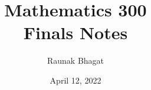 \documentclass{article}
\newcommand{\myname}{Raunak Bhagat}
\begin{document}
\title{Mathematics 300\\Finals Notes}
\author{\myname}
\date{April 12, 2022}
\maketitle

\newpage

\end{document}
